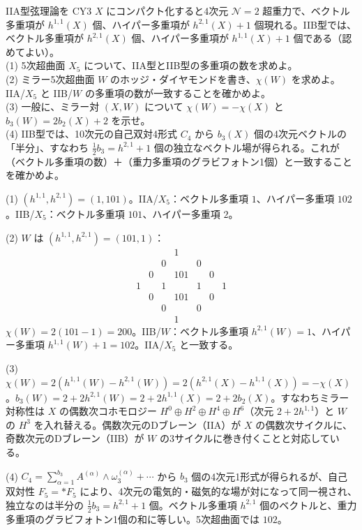 \begin{problem}[難易度 B]\label{ch10-prob-mirror}
IIA型弦理論を CY3 $X$ にコンパクト化すると4次元 $\mathcal N=2$ 超重力で、ベクトル多重項が $h^{1,1}(X)$ 個、ハイパー多重項が $h^{2,1}(X)+1$ 個現れる。IIB型では、ベクトル多重項が $h^{2,1}(X)$ 個、ハイパー多重項が $h^{1,1}(X)+1$ 個である（認めてよい）。\\
(1) 5次超曲面 $X_5$ について、IIA型とIIB型の多重項の数を求めよ。\\
(2) ミラー5次超曲面 $W$ のホッジ・ダイヤモンドを書き、$\chi(W)$ を求めよ。IIA/$X_5$ と IIB/$W$ の多重項の数が一致することを確かめよ。\\
(3) 一般に、ミラー対 $(X,W)$ について $\chi(W)=-\chi(X)$ と $b_3(W)=2b_2(X)+2$ を示せ。\\
(4) IIB型では、10次元の自己双対4形式 $C_4$ から $b_3(X)$ 個の4次元ベクトルの「半分」、すなわち $\frac12b_3=h^{2,1}+1$ 個の独立なベクトル場が得られる。これが（ベクトル多重項の数）＋（重力多重項のグラビフォトン1個）と一致することを確かめよ。
\end{problem}

\begin{solution}
(1) $(h^{1,1},h^{2,1})=(1,101)$。IIA/$X_5$：ベクトル多重項 $1$、ハイパー多重項 $102$。IIB/$X_5$：ベクトル多重項 $101$、ハイパー多重項 $2$。

(2) $W$ は $(h^{1,1},h^{2,1})=(101,1)$：
\[
\begin{matrix}
&&&1&&&\\
&&0&&0&&\\
&0&&101&&0&\\
1&&1&&1&&1\\
&0&&101&&0&\\
&&0&&0&&\\
&&&1&&&
\end{matrix}
\]
$\chi(W)=2(101-1)=200$。IIB/$W$：ベクトル多重項 $h^{2,1}(W)=1$、ハイパー多重項 $h^{1,1}(W)+1=102$。IIA/$X_5$ と一致する。

(3) $\chi(W)=2(h^{1,1}(W)-h^{2,1}(W))=2(h^{2,1}(X)-h^{1,1}(X))=-\chi(X)$。$b_3(W)=2+2h^{2,1}(W)=2+2h^{1,1}(X)=2+2b_2(X)$。すなわちミラー対称性は $X$ の偶数次コホモロジー $H^0\oplus H^2\oplus H^4\oplus H^6$（次元 $2+2h^{1,1}$）と $W$ の $H^3$ を入れ替える。偶数次元のDブレーン（IIA）が $X$ の偶数次サイクルに、奇数次元のDブレーン（IIB）が $W$ の3サイクルに巻き付くことと対応している。

(4) $C_4=\sum_{\alpha=1}^{b_3}A^{(\alpha)}\wedge\omega_3^{(\alpha)}+\cdots$ から $b_3$ 個の4次元1形式が得られるが、自己双対性 $F_5={*F_5}$ により、4次元の電気的・磁気的な場が対になって同一視され、独立なのは半分の $\frac12b_3=h^{2,1}+1$ 個。ベクトル多重項 $h^{2,1}$ 個のベクトルと、重力多重項のグラビフォトン1個の和に等しい。5次超曲面では $102$。
\end{solution}

